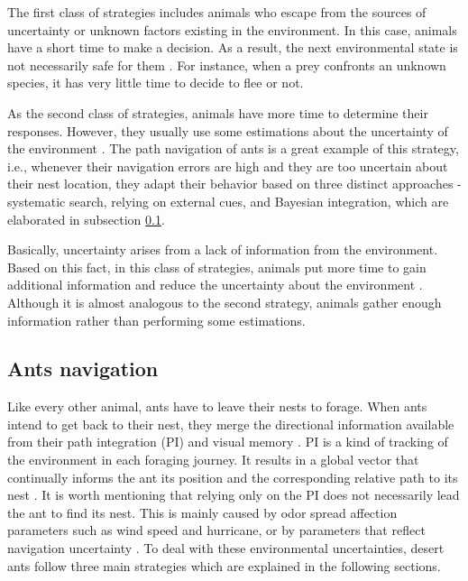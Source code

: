 \documentclass[12pt,a4paper]{article}
\begin{document}
	The first class of strategies includes animals who escape from the sources of uncertainty or unknown factors existing in the environment. In this case, animals have a short time to make a decision. As a result, the next environmental state is not necessarily safe for them \cite{ferrari2018understanding}. For instance, when a prey confronts an unknown species, it has very little time to decide to flee or not.
	
	As the second class of strategies, animals have more time to determine their responses. However, they usually use some estimations about the uncertainty of the environment \cite{schwarz2020how}. The path navigation of ants is a great example of this strategy, i.e., whenever their navigation errors are high and they are too uncertain about their nest location, they adapt their behavior based on three distinct approaches - systematic search, relying on external cues, and Bayesian integration, which are elaborated in subsection \ref{sec:ants_navigation}.
	
	Basically, uncertainty arises from a lack of information from the environment. Based on this fact, in this class of strategies, animals put more time to gain additional information and reduce the uncertainty about the environment \cite{keagy2016female}. Although it is almost analogous to the second strategy, animals gather enough information rather than performing some estimations.
	
	\subsection{Ants navigation}
	\label{sec:ants_navigation}
	
	Like every other animal, ants have to leave their nests to forage. When ants intend to get back to their nest, they merge the directional information available from their path integration (PI) and visual memory \cite{wystrach2015optimal}. PI is a kind of tracking of the environment in each foraging journey. It results in a global vector that continually informs the ant its position and the corresponding relative path to its nest \cite{andel2004path}. It is worth mentioning that relying only on the PI does not necessarily lead the ant to find its nest. This is mainly caused by odor spread affection parameters such as wind speed and hurricane, or by parameters that reflect navigation uncertainty \cite{wolf2005desert}. To deal with these environmental uncertainties, desert ants follow three main strategies which are explained in the following sections.
	
\end{document}
